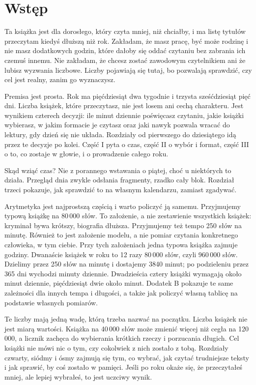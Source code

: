 \chapter*{Wstęp}

Ta książka jest dla dorosłego, który czyta mniej, niż chciałby, i ma listę tytułów
\glqq przeczytam kiedyś\grqq{} dłuższą niż rok. Zakładam, że masz pracę, być może rodzinę
i nie masz dodatkowych godzin, które dałoby się oddać czytaniu bez zabrania ich czemuś innemu.
Nie zakładam, że chcesz zostać zawodowym czytelnikiem ani że lubisz wyzwania liczbowe.
Liczby pojawiają się tutaj, bo pozwalają sprawdzić, czy cel jest realny, zanim go wyznaczysz.

Premisa jest prosta. Rok ma pięćdziesiąt dwa tygodnie i trzysta sześćdziesiąt pięć dni.
Liczba książek, które przeczytasz, nie jest losem ani cechą charakteru. Jest wynikiem czterech
decyzji: ile minut dziennie poświęcasz czytaniu, jakie książki wybierasz, w jakim formacie je
czytasz oraz jaki nawyk pozwala wracać do lektury, gdy dzień się nie układa. Rozdziały od
pierwszego do dziesiątego idą przez te decyzje po kolei. Część I pyta o czas, część II o wybór
i format, część III o to, co zostaje w głowie, i o prowadzenie całego roku.

Skąd wziąć czas? Nie z porannego wstawania o piątej, choć u niektórych to działa. Przegląd dnia
zwykle odsłania fragmenty, rzadko cały blok. Rozdział trzeci pokazuje, jak sprawdzić to na
własnym kalendarzu, zamiast zgadywać.

Arytmetyka jest najprostszą częścią i warto policzyć ją samemu. Przyjmujemy typową książkę
na 80\,000 słów. To założenie, a nie zestawienie wszystkich książek: kryminał bywa krótszy,
biografia dłuższa. Przyjmujemy też tempo 250 słów na minutę. Również to jest założenie modelu,
a nie pomiar czytania konkretnego człowieka, w tym ciebie. Przy tych założeniach jedna typowa
książka zajmuje  godziny. Dwanaście książek w roku to 12 razy 80\,000 słów,
czyli 960\,000 słów. Dzielimy przez 250 słów na minutę i dostajemy 3840 minut; po podzieleniu
przez 365 dni wychodzi  minuty dziennie. Dwadzieścia cztery książki wymagają około
 minut dziennie, pięćdziesiąt dwie około  minut. Dodatek B pokazuje te
same zależności dla innych tempa i długości, a także jak policzyć własną tablicę na podstawie
własnych pomiarów.

Te liczby mają jedną wadę, którą trzeba nazwać na początku. Liczba książek nie jest miarą
wartości. Książka na 40\,000 słów może zmienić więcej niż cegła na 120\,000, a licznik zachęca do
wybierania krótkich rzeczy i porzucania długich. Cel  książki\grqq{} nie mówi nic o tym,
czy cokolwiek z nich zostało z tobą. Rozdziały czwarty, siódmy i ósmy zajmują się tym, co
wybrać, jak czytać trudniejsze teksty i jak sprawić, by coś zostało w pamięci. Jeśli po roku
okaże się, że przeczytałeś mniej, ale lepiej wybrałeś, to jest uczciwy wynik.

